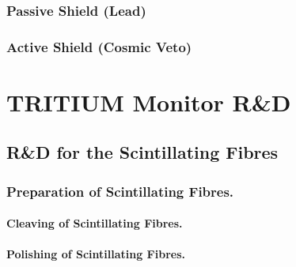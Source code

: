 \documentclass[12pt,a4paper]{book}
\begin{document}
		\subsection{Passive Shield (Lead)}\label{subsec:SetUpPassiveShield}
		
		
		\subsection{Active Shield (Cosmic Veto)}\label{subsec:SetUpActiveShield}
		
		\newpage
					
\chapter{TRITIUM Monitor R\&D}\label{chap:ResearchandDevelopment}
	
	
	\section{R\&D for the Scintillating Fibres}\label{sec:CharacterizationScintillatingFibers}
	
		
		\subsection{Preparation of Scintillating Fibres.}\label{subsec:SurfaceConditioningProcess}
		
				
			\subsubsection{Cleaving of Scintillating Fibres.}\label{subsubsec:CleavingProcess}
			
			
			\subsubsection{Polishing of Scintillating Fibres.}\label{subsubsec:PolishingProcess}
			
			
\end{document}
